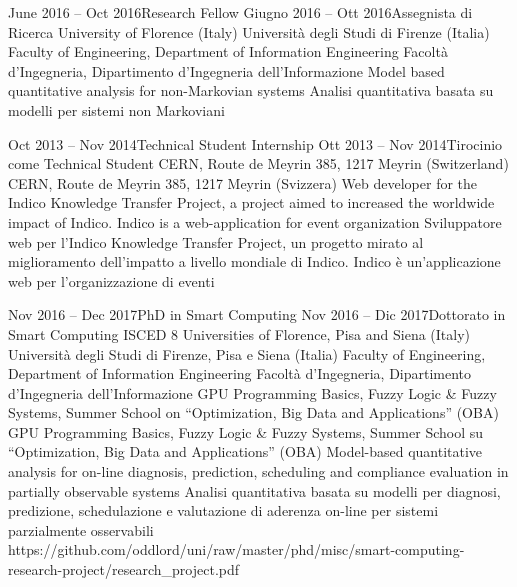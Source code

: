{    \job
    {June 2016 -- Oct 2016}{Research Fellow}
    {Giugno 2016 -- Ott 2016}{Assegnista di Ricerca}
      \jobLocation
        {University of Florence (Italy)}
        {Università degli Studi di Firenze (Italia)}
      \jobDepartment
        {Faculty of Engineering, Department of Information Engineering}
        {Facoltà d'Ingegneria, Dipartimento d'Ingegneria dell'Informazione}
      \jobDescription
        {Model based quantitative analysis for non-Markovian systems}
        {Analisi quantitativa basata su modelli per sistemi non Markoviani}
    
    \job
    {Oct 2013 -- Nov 2014}{Technical Student Internship}
    {Ott 2013 -- Nov 2014}{Tirocinio come Technical Student}
      \jobLocation
        {CERN, Route de Meyrin 385, 1217 Meyrin (Switzerland)}
        {CERN, Route de Meyrin 385, 1217 Meyrin (Svizzera)}
      \jobDescription
        {Web developer for the Indico Knowledge Transfer Project, a project aimed to increased the worldwide impact of Indico. Indico is a web-application for event organization}
        {Sviluppatore web per l'Indico Knowledge Transfer Project, un progetto mirato al miglioramento dell'impatto a livello mondiale di Indico. Indico è un'applicazione web per l'organizzazione di eventi}


  \educationAndTraining
  
    \school
    {Nov 2016 -- Dec 2017}{PhD in Smart Computing}
    {Nov 2016 -- Dic 2017}{Dottorato in Smart Computing}
    {ISCED 8}
      \schoolLocation
        {Universities of Florence, Pisa and Siena (Italy)}
        {Università degli Studi di Firenze, Pisa e Siena (Italia)}
      \schoolFaculty
        {Faculty of Engineering, Department of Information Engineering}
        {Facoltà d'Ingegneria, Dipartimento d'Ingegneria dell'Informazione}
      \courses
        {GPU Programming Basics, Fuzzy Logic \& Fuzzy Systems, Summer School on ``Optimization, Big Data and Applications'' (OBA)}
        {GPU Programming Basics, Fuzzy Logic \& Fuzzy Systems, Summer School su ``Optimization, Big Data and Applications'' (OBA)}
      \thesisURL
        {Model-based quantitative analysis for on-line diagnosis, prediction, scheduling and compliance evaluation in partially observable systems}
        {Analisi quantitativa basata su modelli per diagnosi, predizione, schedulazione e valutazione di aderenza on-line per sistemi parzialmente osservabili}
        {https://github.com/oddlord/uni/raw/master/phd/misc/smart-computing-research-project/research_project.pdf}

}
